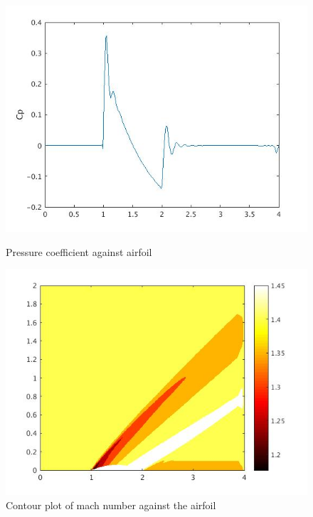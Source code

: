 \documentclass[a4paper,12pt]{article}
\begin{document}
\begin{figure}[!htbp]
\centering
\begin{minipage}[t]{0.48\textwidth} 
\includegraphics[width= \textwidth]{Figures/cp.jpg}
\caption{Pressure coefficient against airfoil}
\label{fig:cp}
\end{minipage}
\begin{minipage}[t]{0.48\textwidth} 
\includegraphics[width= \textwidth]{Figures/machcontour.jpg}
\caption{Contour plot of mach number against the airfoil}
\label{fig:mach}
\end{minipage}
\end{figure}    
\end{document}
